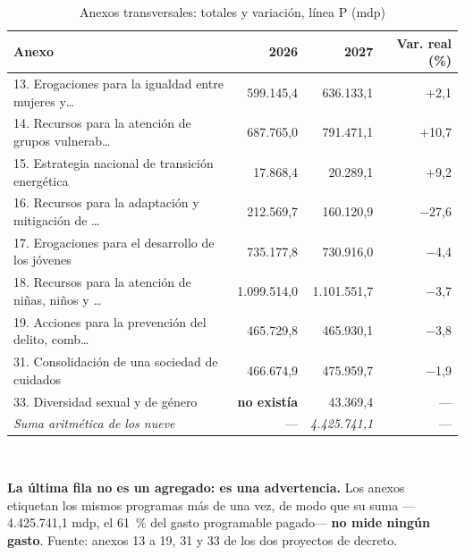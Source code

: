 \begin{table}[htbp]\centering\footnotesize
\caption{Anexos transversales: totales y variación, línea P (mdp)}\label{cua:trans}
\begin{tabular}{lrrr}
\toprule
Anexo & 2026 & 2027 & Var. real (\%) \\
\midrule
13. Erogaciones para la igualdad entre mujeres y… & 599.145,4 & 636.133,1 & +2,1 \\
14. Recursos para la atención de grupos vulnerab… & 687.765,0 & 791.471,1 & +10,7 \\
15. Estrategia nacional de transición energética & 17.868,4 & 20.289,1 & +9,2 \\
16. Recursos para la adaptación y mitigación de … & 212.569,7 & 160.120,9 & $-$27,6 \\
17. Erogaciones para el desarrollo de los jóvenes & 735.177,8 & 730.916,0 & $-$4,4 \\
18. Recursos para la atención de niñas, niños y … & 1.099.514,0 & 1.101.551,7 & $-$3,7 \\
19. Acciones para la prevención del delito, comb… & 465.729,8 & 465.930,1 & $-$3,8 \\
31. Consolidación de una sociedad de cuidados & 466.674,9 & 475.959,7 & $-$1,9 \\
33. Diversidad sexual y de género & \textbf{no existía} & 43.369,4 & --- \\
\emph{Suma aritmética de los nueve} & --- & \emph{4.425.741,1} & --- \\
\bottomrule
\end{tabular}
\\[2pt]\begin{minipage}{0.92\textwidth}\scriptsize \textbf{La última fila no es un agregado: es una advertencia.} Los anexos etiquetan los mismos programas más de una vez, de modo que su suma ---4.425.741,1 mdp, el 61~\% del gasto programable pagado--- \textbf{no mide ningún gasto}. Fuente: anexos 13 a 19, 31 y 33 de los dos proyectos de decreto.\end{minipage}
\end{table}

